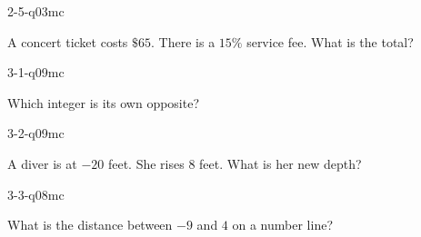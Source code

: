 \begin{practiceQuestion}{2-5-q03}{mc}
\begin{questionText}
A concert ticket costs $\$65$. There is a $15\%$ service fee. What is the total?
\end{questionText}
\end{practiceQuestion}

\begin{practiceQuestion}{3-1-q09}{mc}
\begin{questionText}
Which integer is its own opposite?
\end{questionText}
\end{practiceQuestion}

\begin{practiceQuestion}{3-2-q09}{mc}
\begin{questionText}
A diver is at $-20$ feet. She rises $8$ feet. What is her new depth?
\end{questionText}
\end{practiceQuestion}

\begin{practiceQuestion}{3-3-q08}{mc}
\begin{questionText}
What is the distance between $-9$ and $4$ on a number line?
\end{questionText}
\end{practiceQuestion}


